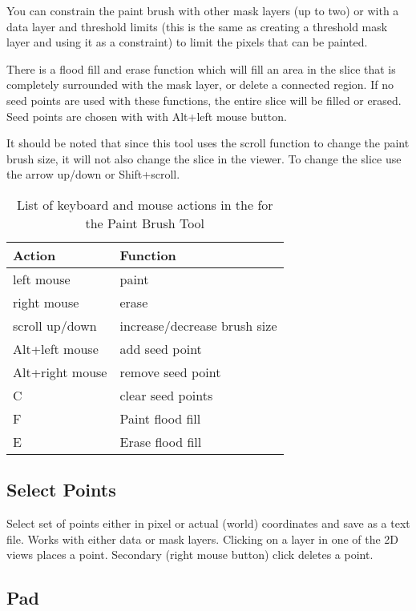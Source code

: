 \documentclass[fleqn,11pt,openany]{book}
\begin{document}
You can constrain the paint brush with other mask layers (up to two) or with a data layer and threshold limits (this is the same as creating a threshold mask layer and using it as a constraint) to limit the pixels that can be painted. 

There is a flood fill and erase function which will fill an area in the slice that is completely surrounded with the mask layer, or delete a connected region.  If no seed points are used with these functions, the entire slice will be filled or erased.  Seed points are chosen with with Alt+left mouse button.  

It should be noted that since this tool uses the scroll function to change the paint brush size, it will not also change the slice in the viewer.  To change the slice use the arrow up/down or Shift+scroll.  


\begin{table}[h!]
\label{tab:paintkey}
\caption{List of keyboard and mouse actions in the for the Paint Brush Tool}
\begin{tabular}{|l|l|}
\hline
{\bf Action} & {\bf Function}\\
\hline 
left mouse & paint \\
\hline
right mouse & erase\\
\hline
scroll up/down & increase/decrease brush size\\
\hline
Alt+left mouse & add seed point\\
\hline
Alt+right mouse & remove seed point\\
\hline 
C & clear seed points\\
\hline
F & Paint flood fill\\
\hline
E & Erase flood fill\\ 
\hline
\end{tabular}
\end{table}

\subsection{Select Points}

Select set of points either in pixel or actual (world) coordinates and save as a text file. Works with either data or mask layers.
Clicking on a layer in one of the 2D views places a point. Secondary (right mouse button) click deletes a point.

\subsection{Pad}
\end{document}
